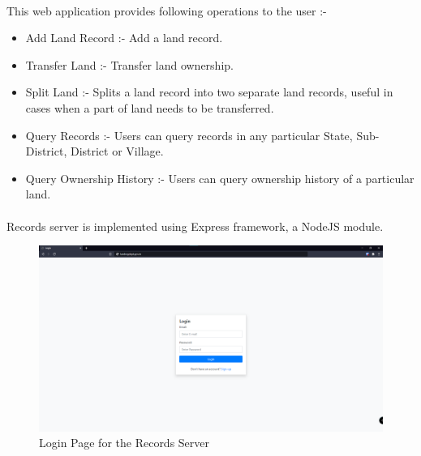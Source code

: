 \documentclass{article}
\begin{document}
        \paragraph{}
        This web application provides following operations to the user :-
        \begin{itemize}
            \item Add Land Record :- Add a land record.
            \item Transfer Land :- Transfer land ownership.
            \item Split Land :- Splits a land record into two separate land records, useful in cases when a part of land needs to be transferred.
            \item Query Records :- Users can query records in any particular State, Sub-District, District or Village.
            \item Query Ownership History :- Users can query ownership history of a particular land.
        \end{itemize}

        \paragraph{}
        Records server is implemented using Express framework, a NodeJS module.

        \begin{figure}[htbp]
            \includegraphics[scale=0.25]{records_login}
            \centering
            \caption{Login Page for the Records Server}
        \end{figure}
\end{document}
